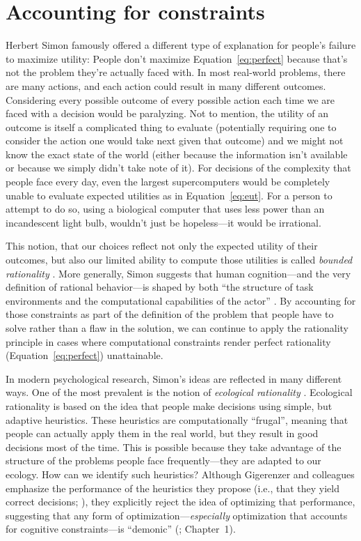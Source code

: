 \section{Accounting for constraints}\label{sec:intro-constraints}

Herbert Simon \citeyearpar{simon1955behavioral} famously offered a different type of explanation for people's failure to maximize utility: People don't maximize Equation~\ref{eq:perfect} because that's not the problem they're actually faced with. In most real-world problems, there are many actions, and each action could result in many different outcomes. Considering every possible outcome of every possible action each time we are faced with a decision would be paralyzing. Not to mention, the utility of an outcome is itself a complicated thing to evaluate (potentially requiring one to consider the action one would take next given that outcome) and we might not know the exact state of the world (either because the information isn't available or because we simply didn't take note of it). For decisions of the complexity that people face every day, even the largest supercomputers would be completely unable to evaluate expected utilities as in Equation~\ref{eq:eut}. For a person to attempt to do so, using a biological computer that uses less power than an incandescent light bulb, wouldn't just be hopeless---it would be irrational. 

This notion, that our choices reflect not only the expected utility of their outcomes, but also our limited ability to compute those utilities is called \emph{bounded rationality} \citep{simon1990bounded}. More generally, Simon suggests that human cognition---and the very definition of rational behavior---is shaped by  both ``the structure of task environments and the computational capabilities of the actor'' \citep{simon1990invariants}. By accounting for those constraints as part of the definition of the problem that people have to solve rather than a flaw in the solution, we can continue to apply the rationality principle in cases where computational constraints render perfect rationality (Equation~\ref{eq:perfect}) unattainable.

In modern psychological research, Simon's ideas are reflected in many different ways. One of the most prevalent is the notion of \emph{ecological rationality} \citep{gigerenzer1999simple,goldstein2002models,todd2012ecological}. Ecological rationality is based on the idea that people make decisions using simple, but adaptive heuristics. These heuristics are computationally ``frugal'', meaning that people can actually apply them in the real world, but they result in good decisions most of the time. This is possible because they take advantage of the structure of the problems people face frequently---they are adapted to our ecology. How can we identify such heuristics? Although Gigerenzer and colleagues emphasize the performance of the heuristics they propose (i.e., that they yield correct decisions; \citealp{goldstein2002models}), they explicitly reject the idea of optimizing that performance, suggesting that any form of optimization---\emph{especially} optimization that accounts for cognitive constraints---is ``demonic'' (\citealp{gigerenzer1999simple}; Chapter~1).

